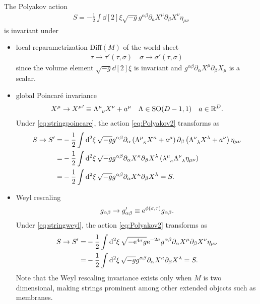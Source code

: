 \documentclass[10pt]{article}
\begin{document}
The Polyakov action
\begin{align}
    S=-\frac{1}{2}\int\dd[2]{\xi}\sqrt{-g}g^{\alpha\beta}\partial_a X^\mu\partial_\beta X^\nu\eta_{\mu\nu}\label{eq:Polyakov2}
\end{align} 
is invariant under
\begin{itemize}
    \item local reparametrization $\mathrm{Diff}(M)$ of the world sheet
          \begin{align}
              \tau\to\tau'(\tau,\sigma)\quad\sigma\to\sigma'(\tau,\sigma)
          \end{align}
          since the volume element $\sqrt{-g}\dd[2]{\xi}$ is invariant and $g^{\alpha\beta}\partial_\alpha X^\mu\partial_\beta X_\mu$ is a scalar.
    \item global Poincar\'e invariance
          \begin{align}
              X^\mu\to {X^{\mu}}'\equiv\tensor{\Lambda}{^\mu_\nu}X^\nu+a^\mu \quad\Lambda\in\text{SO}(D-1,1)\quad a\in\mathbb{R}^D.\label{eq:stringpoincare}
          \end{align}
          Under \eqref{eq:stringpoincare}, the action \eqref{eq:Polyakov2} transforms as 
          \begin{align}
            S\to S'=&-\frac{1}{2}\int\dd[2]{\xi}\sqrt{-g}g^{\alpha\beta}\partial_\alpha\left(\tensor{\Lambda}{^\mu_\kappa}X^\kappa+a^\mu\right)\partial_\beta\left(\tensor{\Lambda}{^\nu_\lambda}X^\lambda+a^\nu\right)\eta_{\mu\nu}\notag\\
                =&-\frac{1}{2}\int\dd[2]{\xi}\sqrt{-g}g^{\alpha\beta}\partial_\alpha X^\kappa\partial_\beta X^\lambda\left(\tensor{\lambda}{^\mu_\kappa}\tensor{\Lambda}{^\nu_\lambda}\eta_{\mu\nu}\right)\notag\\
                =&-\frac{1}{2}\int\dd[2]{\xi}\sqrt{-g}g^{\alpha\beta}\partial_\alpha X^\kappa\partial_\beta X^\lambda=S.
          \end{align}
    \item Weyl rescaling
          \begin{align}
              g_{\alpha\beta}\to g'_{\alpha\beta}\equiv\mathrm{e}^{\phi(\sigma,\tau)}g_{\alpha\beta}.\label{eq:stringweyl}
          \end{align}
          Under \eqref{eq:stringweyl}, the action \eqref{eq:Polyakov2} transforms as 
          \begin{align}
            S\to S'=&-\frac{1}{2}\int\dd[2]{\xi}\sqrt{-\mathrm{e}^{4\sigma}g}\mathrm{e}^{-2\sigma}g^{\alpha\beta}\partial_\alpha X^\mu\partial_\beta X^\nu \eta_{\mu\nu}\notag\\
                =&-\frac{1}{2}\int\dd[2]{\xi}\sqrt{-g}g^{\alpha\beta}\partial_\alpha X^\kappa\partial_\beta X^\lambda=S.
          \end{align}
          Note that the Weyl rescaling invariance exists only when $M$ is two dimensional, making strings prominent among other extended objccts such as membranes.
\end{itemize}
\end{document}
